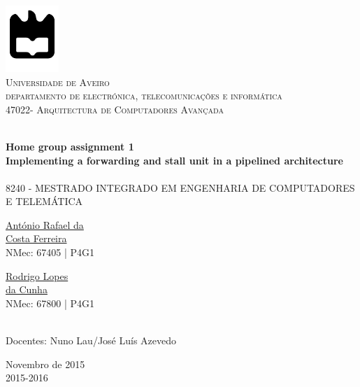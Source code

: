 \begin{titlepage}

\begin{center}

\includegraphics[width=0.15\textwidth]{./logo}\\[0.5cm]    

\textsc{\large Universidade de Aveiro \\[1cm]\large departamento de electrónica, telecomunicações e informática}\\[1cm]

\textsc{\large{47022}\large - Arquitectura de Computadores Avançada \\[1cm]}

\HRule \\[0.5cm]
{ \huge \bfseries  Home group assignment 1}\\[0.4cm]
{ \large \bfseries Implementing a forwarding and stall unit in a pipelined architecture}\\[0.4cm]
\HRule \\[1cm]

\textsc{\small{8240 - MESTRADO INTEGRADO EM ENGENHARIA DE COMPUTADORES E TELEMÁTICA}}\\[1cm]

\begin{minipage}{0.4\textwidth}

\begin{flushleft} \large
\href{mailto:rafael.ferreira@ua.pt}{António Rafael da \\ Costa Ferreira }
 \small{\\NMec: 67405 | P4G1}
\end{flushleft}
\end{minipage}
\begin{minipage}{0.4\textwidth}

\begin{flushright} \large
\href{mailto:rodrigocunha@ua.pt}{Rodrigo Lopes \\ da Cunha}
\small{\\NMec: 67800 | P4G1}
\end{flushright}
\end{minipage}\\[1cm]

{\large Docentes: Nuno Lau/José Luís Azevedo   }\\[0.5cm]

\vfill

{\large Novembro de 2015 \\ 2015-2016}

\end{center}

\end{titlepage}